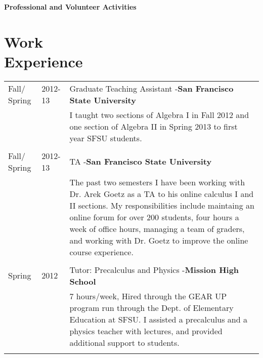 \documentclass[margin,line,pifont,palatino,courier]{res}
\begin{document}

\begin{resume}


{\bf \Large Professional and Volunteer Activities}\\

\section{\bf  Work\\ Experience}

\begin{tabular}{@{}p{0.75in}p{0.5in}p{4in}}


Fall/ Spring & 2012-13  & Graduate Teaching Assistant -{\bf San Francisco State University }  \\
  & 			& 	I taught two sections of Algebra I in Fall 2012  and one section of Algebra II  in Spring 2013 to first year SFSU students.  \\
  		    \\  
		
 Fall/ Spring & 2012-13  & TA -{\bf San Francisco State University }  \\	
 					& & The past two semesters I have been working with Dr. Arek Goetz as a TA to his online calculus I and II sections.  
					My responsibilities include maintaing an online forum for over 200 students, four hours a week of office hours, managing
					a team of graders, and working with Dr. Goetz to improve the online course experience.  \\ \\



Spring & 2012 & Tutor:  Precalculus and Physics -{\bf  Mission High School}\\

  &    &    7 hours/week, Hired through the GEAR UP program run through the Dept. of Elementary Education at SFSU.  I assisted a precalculus and a physics teacher with lectures, and provided additional support to students.  \\
  \\


\end{tabular}
\end{resume}
\end{document}
